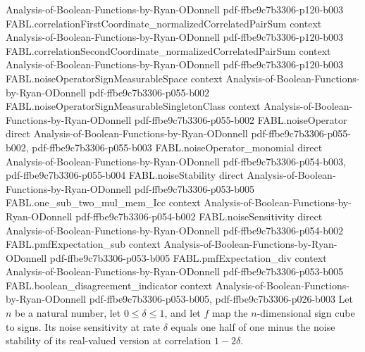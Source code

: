 \begin{theorem}
  {Analysis-of-Boolean-Functions-by-Ryan-ODonnell}
  {pdf-ffbe9c7b3306-p120-b003}
\proofstep
  {FABL.correlationFirstCoordinate_normalizedCorrelatedPairSum}
  {context}
  {Analysis-of-Boolean-Functions-by-Ryan-ODonnell}
  {pdf-ffbe9c7b3306-p120-b003}
\proofstep
  {FABL.correlationSecondCoordinate_normalizedCorrelatedPairSum}
  {context}
  {Analysis-of-Boolean-Functions-by-Ryan-ODonnell}
  {pdf-ffbe9c7b3306-p120-b003}
\proofstep
  {FABL.noiseOperatorSignMeasurableSpace}
  {context}
  {Analysis-of-Boolean-Functions-by-Ryan-ODonnell}
  {pdf-ffbe9c7b3306-p055-b002}
\proofstep
  {FABL.noiseOperatorSignMeasurableSingletonClass}
  {context}
  {Analysis-of-Boolean-Functions-by-Ryan-ODonnell}
  {pdf-ffbe9c7b3306-p055-b002}
\proofstep
  {FABL.noiseOperator}
  {direct}
  {Analysis-of-Boolean-Functions-by-Ryan-ODonnell}
  {pdf-ffbe9c7b3306-p055-b002,
    pdf-ffbe9c7b3306-p055-b003}
\proofstep
  {FABL.noiseOperator_monomial}
  {direct}
  {Analysis-of-Boolean-Functions-by-Ryan-ODonnell}
  {pdf-ffbe9c7b3306-p054-b003,
    pdf-ffbe9c7b3306-p055-b004}
\proofstep
  {FABL.noiseStability}
  {direct}
  {Analysis-of-Boolean-Functions-by-Ryan-ODonnell}
  {pdf-ffbe9c7b3306-p053-b005}
\proofstep
  {FABL.one_sub_two_mul_mem_Icc}
  {context}
  {Analysis-of-Boolean-Functions-by-Ryan-ODonnell}
  {pdf-ffbe9c7b3306-p054-b002}
\proofstep
  {FABL.noiseSensitivity}
  {direct}
  {Analysis-of-Boolean-Functions-by-Ryan-ODonnell}
  {pdf-ffbe9c7b3306-p054-b002}
\proofstep
  {FABL.pmfExpectation_sub}
  {context}
  {Analysis-of-Boolean-Functions-by-Ryan-ODonnell}
  {pdf-ffbe9c7b3306-p053-b005}
\proofstep
  {FABL.pmfExpectation_div}
  {context}
  {Analysis-of-Boolean-Functions-by-Ryan-ODonnell}
  {pdf-ffbe9c7b3306-p053-b005}
\proofstep
  {FABL.boolean_disagreement_indicator}
  {context}
  {Analysis-of-Boolean-Functions-by-Ryan-ODonnell}
  {pdf-ffbe9c7b3306-p053-b005,
    pdf-ffbe9c7b3306-p026-b003}
Let $n$ be a natural number, let $0\le\delta\le1$, and let $f$ map the $n$-dimensional
sign cube to signs. Its noise sensitivity at rate $\delta$ equals one half of one minus
the noise stability of its real-valued version at correlation $1-2\delta$.
\end{theorem}

